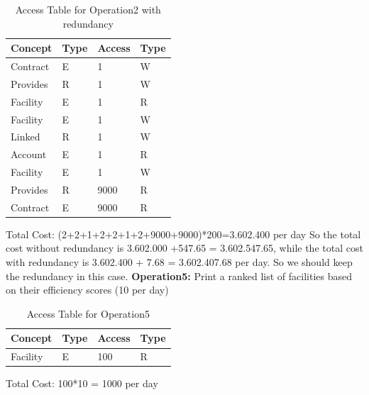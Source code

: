 \begin{table}[H]
    \renewcommand{\arraystretch}{1.3} %
    \begin{tabularx}{\textwidth}{|X|X|X|X|}
    \hline
    \textbf{Concept}& \textbf{Type}  & \textbf{Access}    & \textbf{Type}     \\ \hline
    Contract & E & 1 & W \\ \hline
    Provides & R & 1 & W \\ \hline
    Facility & E & 1 & R \\ \hline
    Facility & E & 1 & W \\ \hline
    Linked & R & 1 & W \\ \hline
    Account & E & 1 & R \\ \hline
    Facility & E & 1 & W \\ \hline
    Provides & R & 9000 & R \\ \hline
    Contract & E & 9000 & R \\ \hline
    \end{tabularx}
    \caption{Access Table for Operation2 with redundancy}
\end{table}
\noindent Total Cost: (2+2+1+2+2+1+2+9000+9000)*200=3.602.400 per day
\newline
\noindent So the total cost without redundancy is 3.602.000 +547.65 = 3.602.547.65, while the total cost with redundancy is 3.602.400 + 7.68 = 3.602.407.68 per day. So we should keep the redundancy in this case. 
\newline
\noindent \textbf{Operation5:} Print a ranked list of facilities based on their efficiency scores (10 per day)
\begin{table}[H]
    \renewcommand{\arraystretch}{1.3} %
    \begin{tabularx}{\textwidth}{|X|X|X|X|}
    \hline
    \textbf{Concept}& \textbf{Type}  & \textbf{Access}    & \textbf{Type}     \\ \hline
    Facility & E & 100 & R \\ \hline
    \end{tabularx}
    \caption{Access Table for Operation5}
\end{table}
\noindent Total Cost: 100*10 = 1000 per day

